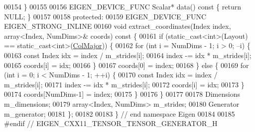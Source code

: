\begin{DoxyCode}
00154   \}
00155 
00156   EIGEN\_DEVICE\_FUNC Scalar* data()\textcolor{keyword}{ const }\{ \textcolor{keywordflow}{return} NULL; \}
00157 
00158  \textcolor{keyword}{protected}:
00159   EIGEN\_DEVICE\_FUNC EIGEN\_STRONG\_INLINE
00160   \textcolor{keywordtype}{void} extract\_coordinates(Index index, array<Index, NumDims>& coords)\textcolor{keyword}{ const }\{
00161     \textcolor{keywordflow}{if} (static\_cast<int>(Layout) == static\_cast<int>(\hyperlink{group__enums_ggaacded1a18ae58b0f554751f6cdf9eb13a0cbd4bdd0abcfc0224c5fcb5e4f6669a}{ColMajor})) \{
00162       \textcolor{keywordflow}{for} (\textcolor{keywordtype}{int} i = NumDims - 1; i > 0; --i) \{
00163         \textcolor{keyword}{const} Index idx = index / m\_strides[i];
00164         index -= idx * m\_strides[i];
00165         coords[i] = idx;
00166       \}
00167       coords[0] = index;
00168     \} \textcolor{keywordflow}{else} \{
00169       \textcolor{keywordflow}{for} (\textcolor{keywordtype}{int} i = 0; i < NumDims - 1; ++i) \{
00170         \textcolor{keyword}{const} Index idx = index / m\_strides[i];
00171         index -= idx * m\_strides[i];
00172         coords[i] = idx;
00173       \}
00174       coords[NumDims-1] = index;
00175     \}
00176   \}
00177 
00178   Dimensions m\_dimensions;
00179   array<Index, NumDims> m\_strides;
00180   Generator m\_generator;
00181 \};
00182 
00183 \} \textcolor{comment}{// end namespace Eigen}
00184 
00185 \textcolor{preprocessor}{#endif // EIGEN\_CXX11\_TENSOR\_TENSOR\_GENERATOR\_H}
\end{DoxyCode}
